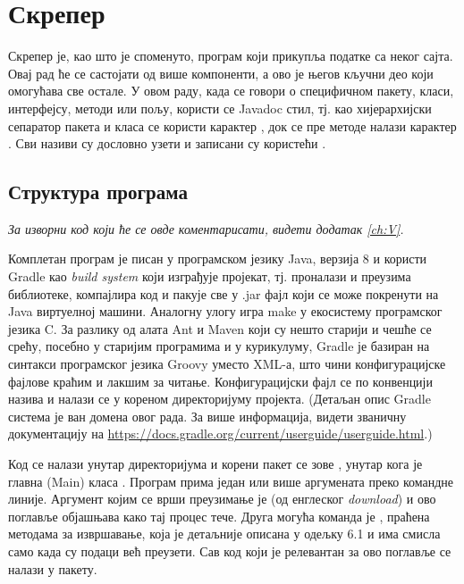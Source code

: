 \chapter{Скрепер}\label{ch:\thechapter}

Скрепер је, као што је споменуто, програм који прикупља податке са неког сајта. Овај рад ће се састојати од више компоненти, а ово је његов кључни део који омогућава све остале. У овом раду, када се говори о специфичном пакету, класи, интерфејсу, методи или пољу, користи се Javadoc стил, тј. као хијерархијски сепаратор пакета и класа се користи карактер , док се пре методе налази карактер \code{\#}. Сви називи су дословно узети и записани су користећи .



\section{Структура програма}
\vspace*{-7mm}
\emph{За изворни код који ће се овде коментарисати, видети додатак \ref{ch:V}.}

Комплетан програм је писан у програмском језику Java, верзија 8 и користи Gradle као \emph{build system} који изграђује пројекат, тј. проналази и преузима библиотеке, компајлира код и пакује све у .jar фајл који се може покренути на Java виртуелној машини. Аналогну улогу игра make у екосистему програмског језика C. За разлику од алата Ant и Maven који су нешто старији и чешће се срећу, посебно у старијим програмима и у курикулуму, Gradle је базиран на синтакси програмског језика Groovy уместо XML-а, што чини конфигурацијске фајлове краћим и лакшим за читање. Конфигурацијски фајл се по конвенцији назива  и налази се у кореном директоријуму пројекта. (Детаљан опис Gradle система је ван домена овог рада. За више информација, видети званичну документацију на \url{https://docs.gradle.org/current/userguide/userguide.html}.)

Код се налази унутар директоријума  и корени пакет се зове , унутар кога је главна (Main) класа . Програм прима један или више аргумената преко командне линије. Аргумент којим се врши преузимање је  (од енглеског \textit{download}) и ово поглавље објашњава како тај процес тече. Друга могућа команда је , праћена методама за извршавање, која је детаљније описана у одељку 6.1 и има смисла само када су подаци већ преузети. Сав код који је релевантан за ово поглавље се налази у  пакету.



